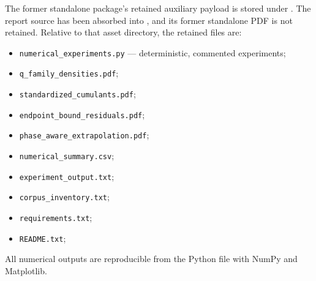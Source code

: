 \documentclass[11pt]{article}
\numberwithin{equation}{section}
\theoremstyle{definition}
\theoremstyle{remark}
\begin{document}
The former standalone package's retained auxiliary payload is stored under
.  The report source has been absorbed into
, and its former standalone PDF is not retained.  Relative to
that asset directory, the retained files are:
\begin{itemize}
\item \texttt{numerical\_experiments.py} --- deterministic, commented experiments;
\item \texttt{q\_family\_densities.pdf};
\item \texttt{standardized\_cumulants.pdf};
\item \texttt{endpoint\_bound\_residuals.pdf};
\item \texttt{phase\_aware\_extrapolation.pdf};
\item \texttt{numerical\_summary.csv};
\item \texttt{experiment\_output.txt};
\item \texttt{corpus\_inventory.txt};
\item \texttt{requirements.txt};
\item \texttt{README.txt};
\end{itemize}
All numerical outputs are reproducible from the Python file with NumPy and Matplotlib.
\end{document}
